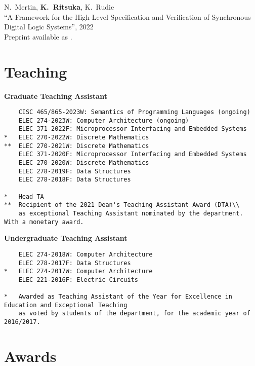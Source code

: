 \documentclass[margin]{res}
\begin{document}
\begin{resume}
N.~Mertin, {\bf K.~Ritsuka}, K.~Rudie\\
``A Framework for the High-Level Specification and Verification of Synchronous Digital Logic Systems'',
2022\\
Preprint available as .


\section{Teaching}

\textbf{Graduate Teaching Assistant}

\begin{lstlisting}
    CISC 465/865-2023W: Semantics of Programming Languages (ongoing)
    ELEC 274-2023W: Computer Architecture (ongoing)
    ELEC 371-2022F: Microprocessor Interfacing and Embedded Systems
*   ELEC 270-2022W: Discrete Mathematics
**  ELEC 270-2021W: Discrete Mathematics
    ELEC 371-2020F: Microprocessor Interfacing and Embedded Systems
    ELEC 270-2020W: Discrete Mathematics
    ELEC 278-2019F: Data Structures
    ELEC 278-2018F: Data Structures

*   Head TA
**  Recipient of the 2021 Dean's Teaching Assistant Award (DTA)\\
    as exceptional Teaching Assistant nominated by the department. With a monetary award.
\end{lstlisting}

\textbf{Undergraduate Teaching Assistant}

\begin{lstlisting}
    ELEC 274-2018W: Computer Architecture
    ELEC 278-2017F: Data Structures
*   ELEC 274-2017W: Computer Architecture
    ELEC 221-2016F: Electric Circuits

*   Awarded as Teaching Assistant of the Year for Excellence in Education and Exceptional Teaching
    as voted by students of the department, for the academic year of 2016/2017.
\end{lstlisting}


\section{Awards}



\end{resume}
\end{document}
